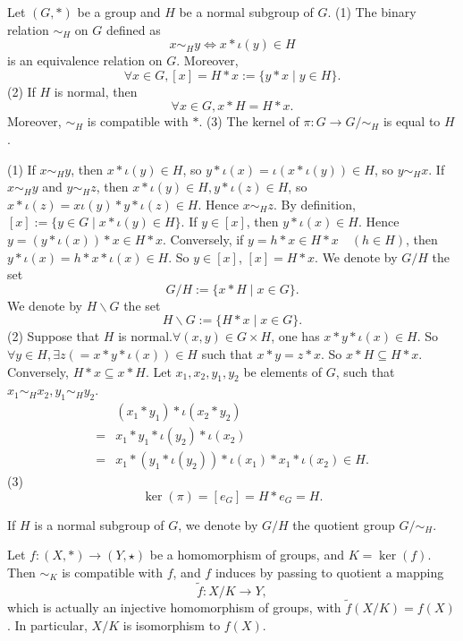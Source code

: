 \documentclass{book}
\numberwithin{equation}{section}
\begin{document}
\begin{propositionenv}
    Let $(G, *)$ be a group and $H$ be a normal subgroup of $G$.
    \newline
    (1) The binary relation $\sim_H$ on $G$ defined as 
    $$x\sim_H y\Leftrightarrow x*\iota(y)\in H$$
    is an equivalence relation on $G$. Moreover,  
    $$\forall x\in G,  [x]=H*x:=\{y*x\mid y\in H\}.$$
    (2) If $H$ is normal,  then
    $$\forall x\in G, x*H=H*x.$$
    Moreover,  $\sim_H$ is compatible with $*$.
    \newline
    (3) The kernel of $\pi :G\rightarrow G/\sim_H$ is equal to $H$.
\end{propositionenv}
\begin{proofenv}
    \quad\newline
    (1) If $x\sim_H y$,  then $x*\iota(y)\in H$,  so $y*\iota(x)=\iota(x*\iota(y))\in H$,  so $y\sim_H x$. If $x\sim_H y$ and $y\sim_H z$,  then $x*\iota(y)\in H,  y*\iota(z)\in H$,  so $x*\iota(z)=x\iota(y)*y*\iota(z)\in H$. Hence $x\sim_H z$. By definition,  $[x]:=\{y\in G\mid  x*\iota(y)\in H\}$. If $y\in [x]$,  then $y*\iota(x)\in H$. Hence $y=(y*\iota(x))*x\in H*x$. Conversely,  if $y=h*x\in H*x \quad (h\in H)$,  then $y*\iota(x)=h*x*\iota(x)\in H$. So $y\in [x]$,  $[x]=H*x$.
    \newline
    We denote by $G/H $ the set 
    $$G/H:=\{x*H\mid x\in G\}.$$ 
    We denote by $H\backslash G$ the set 
    $$H\backslash G:=\{H*x\mid x\in G\}.$$
    (2) Suppose that $H$ is normal.$\forall (x, y)\in G\times H$,  one has $x*y*\iota(x)\in H$. So $\forall y\in H, \exists z(=x*y*\iota(x))\in H$ such that $x*y=z*x$. So $x*H\subseteq H*x$. Conversely,  $H*x\subseteq x*H$. Let $x_1, x_2, y_1, y_2$ be elements of $G$,  such that $x_1\sim_H x_2, y_1\sim_H y_2$.
    \begin{align*}
&(x_1*y_1)*\iota (x_2*y_2)\\
=&x_1*y_1*\iota (y_2)*\iota (x_2)\\
=&x_1*(y_1*\iota (y_2))*\iota (x_1)*x_1*\iota (x_2)\in H.
\end{align*}
    (3)$$\ker(\pi)=[e_G]=H*e_G=H.$$
\end{proofenv}
\begin{notationenv}
    If $H$ is a normal subgroup of $G$,  we denote by $G/H$ the quotient group $G/\sim_H$.
\end{notationenv}
\begin{theoremenv}
    Let $f:(X, *)\rightarrow (Y, \star)$ be a homomorphism of groups,  and $K=\ker(f)$. Then $\sim_K$ is compatible with $f$,  and $f$ induces by passing to quotient a mapping
    $$\tilde{f}:X/K\longrightarrow Y, $$
    which is actually an injective homomorphism of groups,  with $\tilde{f}(X/K)=f(X)$. In particular,  $X/K$ is isomorphism to $f(X)$.
        \begin{center}
\end{center}
\end{theoremenv}
\end{document}
